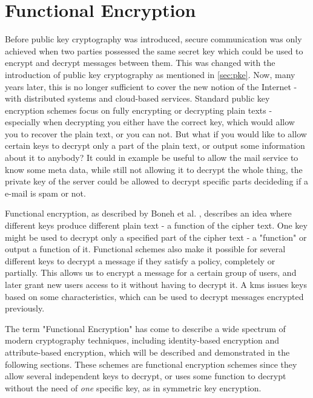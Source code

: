 \section{Functional Encryption}
Before public key cryptography was introduced, secure communication was only achieved when two parties possessed the same secret key which could be used to encrypt and decrypt messages between them. This was changed with the introduction of public key cryptography as mentioned in \ref{sec:pke}. Now, many years later, this is no longer sufficient to cover the new notion of the Internet - with distributed systems and cloud-based services. Standard public key encryption schemes focus on fully encrypting or decrypting plain texts - especially when decrypting you either have the correct key, which would allow you to recover the plain text, or you can not. But what if you would like to allow certain keys to decrypt only a part of the plain text, or output some information about it to anybody? It could in example be useful to allow the mail service to know some meta data, while still not allowing it to decrypt the whole thing, the private key of the server could be allowed to decrypt specific parts decideding if a e-mail is spam or not.
\par Functional encryption, as described by Boneh et al. \cite{boneh2012functional}, describes an idea where different keys produce different plain text - a function of the cipher text. One key might be used to decrypt only a specified part of the cipher text - a "function" or output a function of it. Functional schemes also make it possible for several different keys to decrypt a message if they satisfy a policy, completely or partially. This allows us to encrypt a message for a certain group of users, and later grant new users access to it without having to decrypt it. A \gls{kms} issues keys based on some characteristics, which can be used to decrypt messages encrypted previously. 
\par The term "Functional Encryption" has come to describe a wide spectrum of modern cryptography techniques, including identity-based encryption and attribute-based encryption, which will be described and demonstrated in the following sections. These schemes are functional encryption schemes since they allow several independent keys to decrypt, or uses some function to decrypt without the need of \emph{one} specific key, as in symmetric key encryption.


